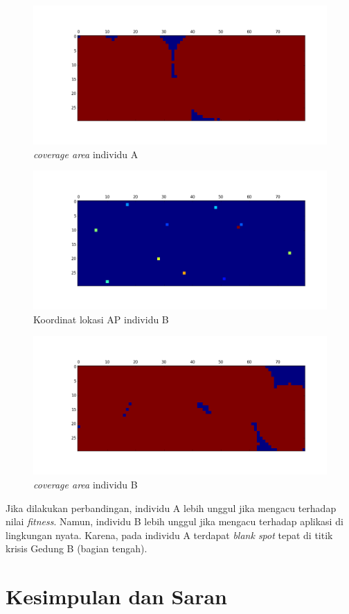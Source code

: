 \documentclass[12pt,a4paper]{report}
\begin{document}
		\begin{figure}[h]
			\centering
			\includegraphics[width=0.5\linewidth]{coverage_02}
			\caption{\emph{coverage area} individu A}
			\label{fig:coverage_02}
		\end{figure}
		
		\begin{figure}[h]
		\centering
		\includegraphics[width=0.5\linewidth]{apLoc_05}
		\caption{Koordinat lokasi AP individu B}
		\label{fig:apLoc_05}
		\end{figure}
		
		\begin{figure}[h]
		\centering
		\includegraphics[width=0.5\linewidth]{coverage_05}
		\caption{\emph{coverage area} individu B}
		\label{fig:coverage_05}
		\end{figure}
		
		Jika dilakukan perbandingan, individu A lebih unggul jika mengacu terhadap nilai \emph{fitness}. Namun, individu B lebih unggul jika mengacu terhadap aplikasi di lingkungan nyata. Karena, pada individu A terdapat \emph{blank spot} tepat di titik krisis Gedung B (bagian tengah).
		\chapter{Kesimpulan dan Saran}
\end{document}
